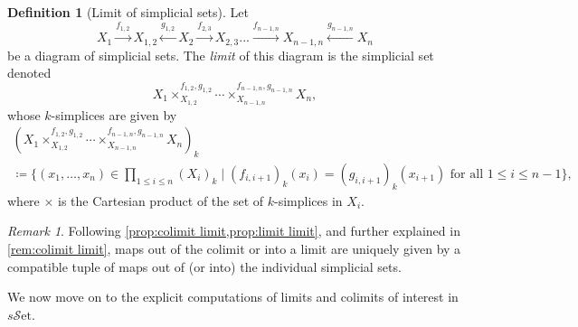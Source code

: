 \documentclass[11pt, a4paper]{amsart}
\newcommand{\sSet}{s\mathscr{S}\mathrm{et}}
\theoremstyle{definition}
\newtheorem{definition}[equation]{Definition}
\theoremstyle{remark}
\newtheorem{remark}[equation]{Remark}
\numberwithin{equation}{section}
\begin{document}
\begin{definition}[Limit of simplicial sets] \label{def:limit sset}
 Let 
  \[X_1 \xrightarrow{f_{1,2}} X_{1,2} \xleftarrow{g_{1,2}} X_2 \xrightarrow{f_{2,3}} X_{2,3} ... \xrightarrow{f_{n-1,n}} X_{n-1,n} \xleftarrow{g_{n-1,n}} X_n \]
  be a diagram of simplicial sets. The \emph{limit} of this diagram is the simplicial set denoted 
  \[X_1 \times_{X_{1,2}}^{f_{1,2},g_{1,2}} \cdots \times_{X_{n-1,n}}^{f_{n-1,n},g_{n-1,n}} X_n,\] 
  whose $k$-simplices are given by
  \begin{multline*}
    (X_1 \times_{X_{1,2}}^{f_{1,2},g_{1,2}} \cdots \times_{X_{n-1,n}}^{f_{n-1,n},g_{n-1,n}} X_n)_k \\
    \coloneq \{(x_1,\dots,x_n)\in \prod_{1 \le i \le n} (X_i)_k \mid (f_{i,i+1})_k(x_i) = (g_{i,i+1})_k(x_{i+1}) \text{ for all } 1 \le i \le n-1\},
  \end{multline*}
 where $\times$ is the Cartesian product of the set of $k$-simplices in $X_i$.
\end{definition}

\begin{remark}
  Following \cref{prop:colimit limit,prop:limit limit}, and further explained in \cref{rem:colimit limit}, maps out of the colimit or into a limit are uniquely given by a compatible tuple of maps out of (or into) the individual simplicial sets.
\end{remark}

We now move on to the explicit computations of limits and colimits of interest in $\sSet$.
\end{document}
